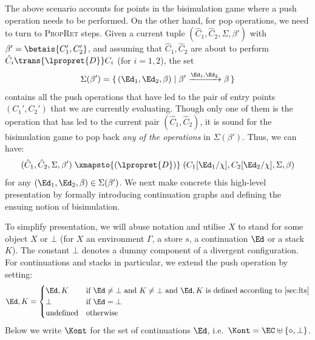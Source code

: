 The above scenario accounts for points in the bisimulation game where a push operation needs to be performed. On the other hand, for pop operations, we need to turn to \textsc{PropRet} steps. Given a current 
tuple $(\hat C_1,\hat C_2,\Sigma,\beta')$ with $\beta'=\betais{C_1',C_2'}$, and assuming that $\hat C_1,\hat C_2$ are about to perform
 $\hat C_i\trans{\lpropret{D}}C_i$ (for $i=1,2$),  
 the set
\[
  \Sigma(\beta') = \{\,(\Ed_1,\Ed_2,\beta)\mid \beta'\xrightarrow{\Ed_1,\Ed_2}\beta\,\}
\]
contains all the push operations that have led to the pair of entry points  $(C_1',C_2')$ that we are currently evaluating. Though only one of them is the operation that has led to the current pair $(\hat C_1,\hat C_2)$, it is sound for the bisimulation game to pop back \emph{any of the operations} in $\Sigma(\beta')$. Thus, we can have:
\[
(\hat C_1,\hat C_2,\Sigma,\beta')\;  \xmapsto{(\lpropret{D})}\; (C_1[\Ed_1/\chi],C_2[\Ed_2/\chi],\Sigma,\beta)
\]
for any $(\Ed_1,\Ed_2,\beta)\in\Sigma(\beta')$.
We next make concrete this high-level presentation by formally introducing continuation graphs and defining the ensuing notion of bisimulation. 
  
    
  To simplify presentation, we will
abuse notation and utilise $X$ to stand for some object $X$ or $\bot$ (for $X$ an environment $\Gamma$, a store $s$, a continuation $\Ed$ or a stack $K$). The constant $\bot$ denotes a dummy component of a divergent configuration. For continuations and stacks in particular, we extend the push operation by setting:
\[
  \Ed,K = \begin{cases}
    \Ed,K &\text{if {$\Ed\not=\bot$ and $K\not=\bot$} and $\Ed,K$ is defined {according to \cref{sec:lts}}}\\
    \bot &\text{if $\Ed=\bot$}\\
    \text{undefined} &\text{otherwise}
    \end{cases}
\]
Below we write $\Kont$ for the set of continuations $\Ed$, i.e.\
$\Kont=\EC\uplus\{\diamond,\bot\}$.

